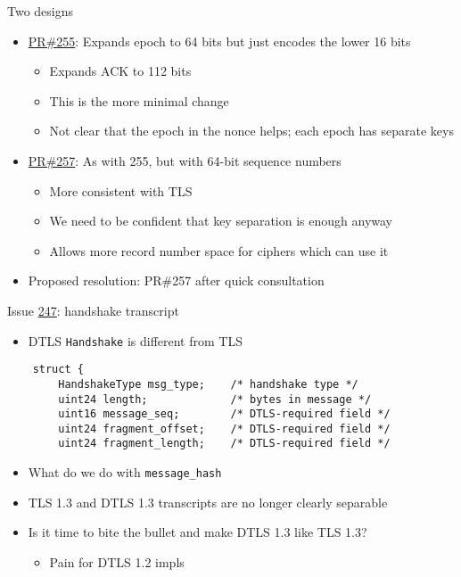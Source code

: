 \documentclass[helvetica]{beamer}
\begin{document}
\begin{frame}{Two designs}

  \begin{itemize}
  \item \href{https://github.com/tlswg/dtls13-spec/pull/255}{PR\#255}: 
    Expands epoch to 64 bits but just encodes the lower 16 bits
      \begin{itemize}
      \item Expands ACK to 112 bits        
      \item This is the more minimal change
      \item Not clear that the epoch in the nonce helps; each epoch has separate keys
      \end{itemize}

    \item \href{https://github.com/tlswg/dtls13-spec/pull/257}{PR\#257}:
        As with 255, but with 64-bit sequence numbers
        \begin{itemize}
        \item More consistent with TLS
        \item We need to be confident that key separation is enough anyway
        \item Allows more record number space for ciphers which can use it
        \end{itemize}
      \item Proposed resolution: PR\#257 after quick consultation
    \end{itemize}
\end{frame}                             


\begin{frame}[fragile]{Issue \href{https://github.com/tlswg/dtls13-spec/issues/247}{247}: handshake transcript}
  
  
  \begin{itemize}
  \item DTLS \texttt{Handshake} is different from TLS
  \end{itemize}

  \begin{verbatim}
    struct {
        HandshakeType msg_type;    /* handshake type */
        uint24 length;             /* bytes in message */
        uint16 message_seq;        /* DTLS-required field */
        uint24 fragment_offset;    /* DTLS-required field */
        uint24 fragment_length;    /* DTLS-required field */
\end{verbatim}

  \begin{itemize}
  \item What do we do with \verb^message_hash^
  \item TLS 1.3 and DTLS 1.3 transcripts are no longer clearly separable
  \item Is it time to bite the bullet and make DTLS 1.3 like TLS 1.3?
    \begin{itemize}
    \item Pain for DTLS 1.2 impls
    \end{itemize}
  \end{itemize}
  
\end{frame}
\end{document}
